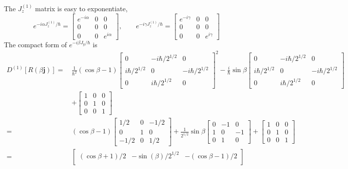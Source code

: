 \documentclass[../principles-of-quantum-mechanics.tex]{subfiles}
\begin{document}
\begin{questions}
		\begin{solution}
			The $J_z^{(1)}$ matrix is easy to exponentiate,
			$$e^{-i\alpha J_z^{(1)}/\hbar} = \begin{bmatrix}e^{-i\alpha} & 0 & 0 \\ 0 & 0 & 0 \\ 0 & 0 & e^{i\alpha}\end{bmatrix}, \qquad e^{-i\gamma J_z^{(1)}/\hbar} = \begin{bmatrix}e^{-i\gamma} & 0 & 0 \\ 0 & 0 & 0 \\ 0 & 0 & e^{i\gamma}\end{bmatrix}$$
			The compact form of $e^{-i\beta J_y/\hbar}$ is
			\begin{align*}
				D^{(1)}[R(\beta\mathbf{j})] =\,&\frac{1}{\hbar^2}(\cos\beta - 1)\begin{bmatrix}0 & -i\hbar/2^{1/2} & 0 \\ i\hbar/2^{1/2} & 0 & -i\hbar/2^{1/2} \\ 0 & i\hbar/2^{1/2} & 0\end{bmatrix}^2 - \frac{i}{\hbar}\sin\beta\begin{bmatrix}0 & -i\hbar/2^{1/2} & 0 \\ i\hbar/2^{1/2} & 0 & -i\hbar/2^{1/2} \\ 0 & i\hbar/2^{1/2} & 0\end{bmatrix} \\
				&+ \begin{bmatrix}1 & 0 & 0 \\ 0 & 1 & 0 \\ 0 & 0 & 1\end{bmatrix} \\
				=\,&(\cos\beta - 1)\begin{bmatrix}1/2 & 0 & -1/2 \\ 0 & 1 & 0 \\ -1/2 & 0 & 1/2\end{bmatrix} + \frac{1}{2^{1/2}}\sin\beta\begin{bmatrix}0 & -1 & 0 \\ 1 & 0 & -1 \\ 0 & 1 & 0\end{bmatrix} + \begin{bmatrix}1 & 0 & 0 \\ 0 & 1 & 0 \\ 0 & 0 & 1\end{bmatrix} \\
				=\,&\begin{bmatrix}
				(\cos\beta + 1)/2 & -\sin(\beta)/2^{1/2} & -(\cos\beta - 1)/2 \\

\end{bmatrix}
\end{align*}
\end{solution}
\end{questions}
\end{document}
